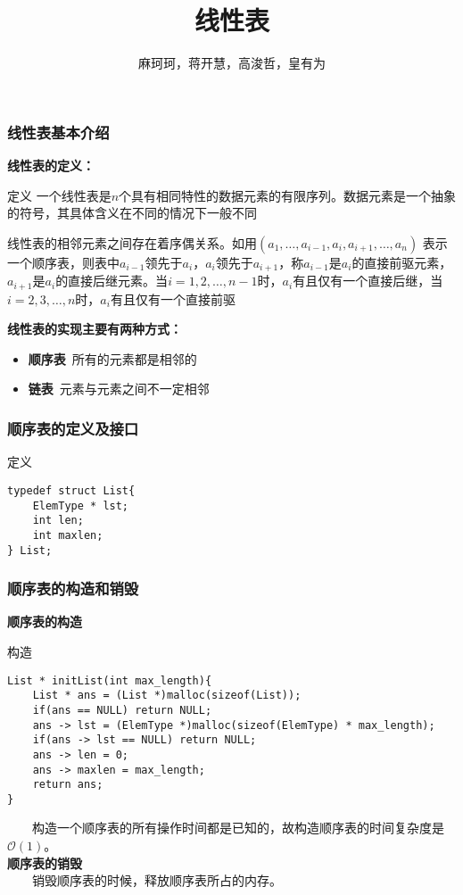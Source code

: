 \documentclass{beamer}
\author{麻珂珂，蒋开慧，高浚哲，皇有为}
\institute{XUPT}
\title{线性表}
\begin{document}
	
	\frame{\titlepage}
	
	\begin{frame}[c]\frametitle{线性表基本介绍}
		\textbf{线性表的定义：}
		\begin{block}{定义}
			一个线性表是$n$个具有相同特性的数据元素的有限序列。数据元素是一个抽象的符号，其具体含义在不同的情况下一般不同 \par
			线性表的相邻元素之间存在着序偶关系。如用$(a_1,\dots, a_{i - 1}, a_i, a_{i + 1},\dots,a_n)$ 表示一个顺序表，则表中$a_{i - 1}$领先于$a_i$，$a_i$领先于$a_{i+1}$，称$a_{i-1}$是$a_i$的直接前驱元素，$a_{i+1}$是$a_i$的直接后继元素。当$i=1,2,\dots,n-1$时，$a_i$有且仅有一个直接后继，当$i=2,3,\dots,n$时，$a_i$有且仅有一个直接前驱
		\end{block}
		\textbf{线性表的实现主要有两种方式：}
		\begin{itemize}
			\item \textbf{顺序表}\ 所有的元素都是相邻的
			\item \textbf{链表}\ 元素与元素之间不一定相邻
		\end{itemize}
	\end{frame}
	
	\begin{frame}[fragile]\frametitle{顺序表的定义及接口}
		\begin{block}{定义}
\begin{verbatim}
typedef struct List{
    ElemType * lst;
    int len;
    int maxlen;
} List;
\end{verbatim}
		\end{block}
	\end{frame}

	\begin{frame}[fragile]\frametitle{顺序表的构造和销毁}
		\textbf{顺序表的构造}
		\begin{block}{构造}
\begin{verbatim}
List * initList(int max_length){
    List * ans = (List *)malloc(sizeof(List));
    if(ans == NULL) return NULL;
    ans -> lst = (ElemType *)malloc(sizeof(ElemType) * max_length);
    if(ans -> lst == NULL) return NULL;
    ans -> len = 0;
    ans -> maxlen = max_length;
    return ans;
}
\end{verbatim}
		\end{block}
		\ \ \ \ 构造一个顺序表的所有操作时间都是已知的，故构造顺序表的时间复杂度是$\mathcal{O}(1)$。\\
		\textbf{顺序表的销毁}\\
		\ \ \ \ 销毁顺序表的时候，释放顺序表所占的内存。
	\end{frame}
\end{document}
